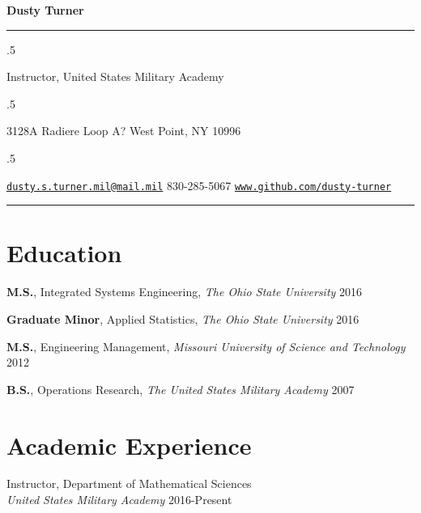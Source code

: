 \documentclass[11pt,]{article}
\providecommand{\tightlist}{%
  \setlength{\itemsep}{0pt}\setlength{\parskip}{0pt}}
\renewenvironment{itemize}{
  \begin{list}{}{
    \setlength{\leftmargin}{1.5em}
  }
}{
  \end{list}
}
\begin{document}
\centerline{\huge \bf Dusty Turner}

\vspace{2 mm}

\hrule

\vspace{2 mm}

\moveleft.5\hoffset\centerline{Instructor, United States Military Academy}
\moveleft.5\hoffset\centerline{3128A Radiere Loop A? West Point, NY 10996}
\moveleft.5\hoffset\centerline{ \faEnvelopeO \hspace{1 mm} \href{mailto:}{\tt \href{mailto:dusty.s.turner.mil@mail.mil}{\nolinkurl{dusty.s.turner.mil@mail.mil}}} \hspace{1 mm}  \faPhone \hspace{1 mm}  830-285-5067  \hspace{1 mm}     \faGlobe \hspace{1 mm} \href{http://www.github.com/dusty-turner}{\tt www.github.com/dusty-turner}   }

\vspace{2 mm}

\hrule


\hypertarget{education}{%
\section{Education}\label{education}}

\begin{itemize}
\tightlist
\item
  \textbf{M.S.}, Integrated Systems Engineering, \emph{The Ohio State
  University} \hfill 2016
\item
  \textbf{Graduate Minor}, Applied Statistics, \emph{The Ohio State
  University} \hfill 2016
\item
  \textbf{M.S.}, Engineering Management, \emph{Missouri University of
  Science and Technology} \hfill 2012
\item
  \textbf{B.S.}, Operations Research, \emph{The United States Military
  Academy} \hfill 2007
\end{itemize}

\hypertarget{academic-experience}{%
\section{Academic Experience}\label{academic-experience}}

\begin{itemize}
\tightlist
\item
  Instructor, Department of Mathematical Sciences\\
  \emph{United States Military Academy} \hfill 2016-Present
\end{itemize}
\end{document}
